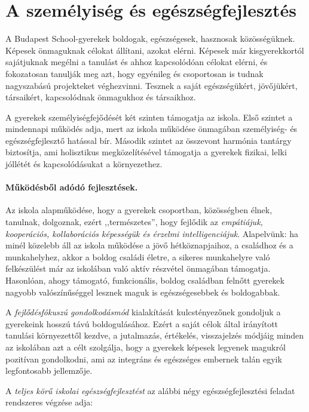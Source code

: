 \section{A személyiség és egészségfejlesztés}
\label{sec:szemilyesegfejlesztes}

A Budapest School-gyerekek boldogak, egészségesek, hasznosak közösségüknek. Képesek önmaguknak célokat állítani, azokat elérni. Képesek  már kisgyerekkortól sajátjuknak megélni a tanulást és ahhoz kapcsolódóan célokat elérni, és fokozatosan tanulják meg azt, hogy egyénileg és csoportosan is tudnak nagyszabású projekteket véghezvinni. Tesznek a saját egészségükért, jövőjükért, társaikért, kapcsolódnak önmagukhoz és társaikhoz.

A gyerekek személyiségfejődését két szinten támogatja az iskola. Első szintet a mindennapi működés adja, mert az iskola működése önmagában személyiség- és egészségfejlesztő hatással bír. Második szintet az összevont harmónia tantárgy biztosítja, ami holisztikus megközelítésével támogatja a gyerekek fizikai, lelki jóllétét és kapcsolódásukat a
környezethez.

\paragraph{Működésből adódó fejlesztések.}
Az iskola alapműködése, hogy a gyerekek csoportban, közösségben élnek, tanulnak, dolgoznak, ezért ,,természetes'', hogy fejlődik az \emph{empátiájuk, kooperációs, kollaborációs képességük és érzelmi intelligenciájuk}. Alapelvünk: ha minél közelebb áll az iskola működése a jövő hétköznapjaihoz, a családhoz és a munkahelyhez, akkor a boldog családi életre, a sikeres munkahelyre való felkészülést már az iskolában való aktív részvétel önmagában támogatja. Hasonlóan, ahogy támogató, funkcionális, boldog családban felnőtt gyerekek nagyobb valószínűséggel lesznek maguk is egészségesebbek és boldogabbak.

A \emph{fejlődésfókuszú gondolkodásmód} kialakítását  kulcstényezőnek gondoljuk a gyerekeink hosszú távú boldogulásához. Ezért a saját célok által irányított tanulási környezettől kezdve, a jutalmazás, értékelés, visszajelzés módjáig minden az iskolában azt a célt szolgálja, hogy a gyerekek képesek legyenek magukról pozitívan gondolkodni, ami az integráns és egészséges embernek talán egyik legfontosabb jellemzője.

A \emph{teljes körű iskolai egészségfejlesztést} az alábbi négy egészségfejlesztési feladat rendszeres végzése adja:

